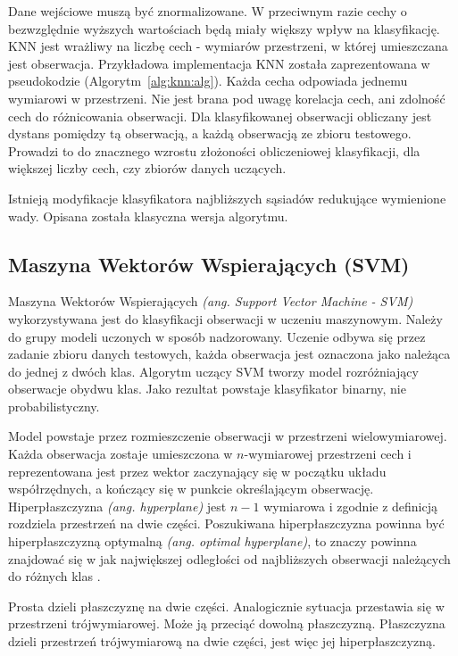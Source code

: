 \documentclass[a4paper,12pt,twoside,openany]{report}
\newcommand{\ang}[1]{\textit{(ang. #1)}}
\newcommand{\Alg}[1]{(Algorytm~\ref{#1})}
\begin{document}
Dane wejściowe muszą być znormalizowane. 
W przeciwnym razie cechy o bezwzględnie wyższych wartościach będą miały większy wpływ na klasyfikację.
KNN jest wrażliwy na liczbę cech - wymiarów przestrzeni, w której umieszczana jest obserwacja. 
Przykładowa implementacja KNN została zaprezentowana w pseudokodzie \Alg{alg:knn:alg}.
Każda cecha odpowiada jednemu wymiarowi w przestrzeni.
Nie jest brana pod uwagę korelacja cech, ani zdolność cech do różnicowania obserwacji.
Dla klasyfikowanej obserwacji obliczany jest dystans pomiędzy tą obserwacją,
a każdą obserwacją ze zbioru testowego.
Prowadzi to do znacznego wzrostu złożoności obliczeniowej klasyfikacji, dla większej liczby cech, czy zbiorów danych uczących.

Istnieją modyfikacje klasyfikatora najbliższych sąsiadów redukujące wymienione wady. 
Opisana została klasyczna wersja algorytmu.

\subsection{Maszyna Wektorów Wspierających (SVM)}

Maszyna Wektorów Wspierających \ang{Support Vector Machine - SVM} wykorzystywana jest do klasyfikacji obserwacji w uczeniu maszynowym.
Należy do grupy modeli uczonych w sposób nadzorowany. 
Uczenie odbywa się przez zadanie zbioru danych testowych, 
każda obserwacja jest oznaczona jako należąca do jednej z dwóch klas.
Algorytm uczący SVM tworzy model rozróżniający obserwacje obydwu klas.
Jako rezultat powstaje klasyfikator binarny, nie probabilistyczny. 

Model powstaje przez rozmieszczenie obserwacji w przestrzeni wielowymiarowej.
Każda obserwacja zostaje umieszczona w $n$-wymiarowej przestrzeni cech i reprezentowana jest przez wektor
zaczynający się w początku układu współrzędnych, a kończący się w punkcie określającym obserwację. 
Hiperpłaszczyzna \ang{hyperplane} jest $n-1$ wymiarowa i zgodnie z definicją rozdziela przestrzeń na dwie części.
Poszukiwana hiperpłaszczyzna powinna być hiperpłaszczyzną optymalną \ang{optimal hyperplane}, 
to znaczy powinna znajdować się w jak największej odległości od najbliższych obserwacji należących do różnych klas \cite{Cortes1995}.

Prosta dzieli płaszczyznę na dwie części.
Analogicznie sytuacja przestawia się w przestrzeni trójwymiarowej.
Może ją przeciąć dowolną płaszczyzną.
Płaszczyzna dzieli przestrzeń trójwymiarową na dwie części, jest więc jej hiperpłaszczyzną.
\end{document}
